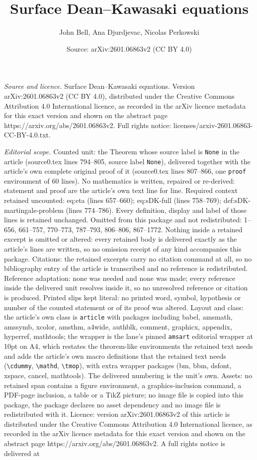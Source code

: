 \documentclass[10pt,a4paper]{amsart}
\title[Surface Dean--Kawasaki equations]{Surface Dean--Kawasaki equations}
\author{John Bell, Ana Djurdjevac, Nicolas Perkowski}
\date{Source: arXiv:2601.06863v2 (CC BY 4.0)}
\begin{document}
\maketitle

\noindent\emph{Source and licence.} Surface Dean--Kawasaki equations. Version arXiv:2601.06863v2 (CC BY 4.0), distributed under the Creative Commons Attribution 4.0 International licence, as recorded in the arXiv licence metadata for this exact version and shown on the abstract page https://arxiv.org/abs/2601.06863v2. Full rights notice: licenses/arxiv-2601.06863-CC-BY-4.0.txt.\par\smallskip

\noindent\textit{Editorial scope.} Counted unit: the Theorem whose source label is \texttt{None} in the article (source0.tex lines 794--805, source label \texttt{None}), delivered together with the article's own complete original proof of it (source0.tex lines 807--866, one \texttt{proof} environment of 60 lines). No mathematics is written, repaired or re-derived: statement and proof are the article's own text line for line. Required context retained uncounted: eq:eta (lines 657--660); eq:sDK-full (lines 758--769); def:sDK-martingale-problem (lines 774--786). Every definition, display and label of those lines is retained unchanged. Omitted from this package and not redistributed: 1--656, 661--757, 770--773, 787--793, 806--806, 867--1772. Nothing inside a retained excerpt is omitted or altered: every retained body is delivered exactly as the article's lines are written, so no omission receipt of any kind accompanies this package. Citations: the retained excerpts carry no citation command at all, so no bibliography entry of the article is transcribed and no reference is redistributed. Reference adaptation: none was needed and none was made; every reference inside the delivered unit resolves inside it, so no unresolved reference or citation is produced. Printed slips kept literal: no printed word, symbol, hypothesis or number of the counted statement or of its proof was altered. Layout and class: the article's own class is \texttt{article} with packages including babel, amsmath, amssymb, xcolor, amsthm, a4wide, authblk, comment, graphicx, appendix, hyperref, mathtools; the wrapper is the lane's pinned \texttt{amsart} editorial wrapper at 10pt on A4, which restates the theorem-like environments the retained text needs and adds the article's own macro definitions that the retained text needs (\texttt{\textbackslash cdummy}, \texttt{\textbackslash mathd}, \texttt{\textbackslash tmop}), with extra wrapper packages (bm, bbm, dsfont, xspace, cancel, mathtools). The delivered numbering is the unit's own. Assets: no retained span contains a figure environment, a graphics-inclusion command, a PDF-page inclusion, a table or a TikZ picture; no image file is copied into this package, the package declares no asset dependency and no image file is redistributed with it. Licence: version arXiv:2601.06863v2 of this article is distributed under the Creative Commons Attribution 4.0 International licence, as recorded in the arXiv licence metadata for this exact version and shown on the abstract page https://arxiv.org/abs/2601.06863v2. A full rights notice is delivered at 
\end{document}
